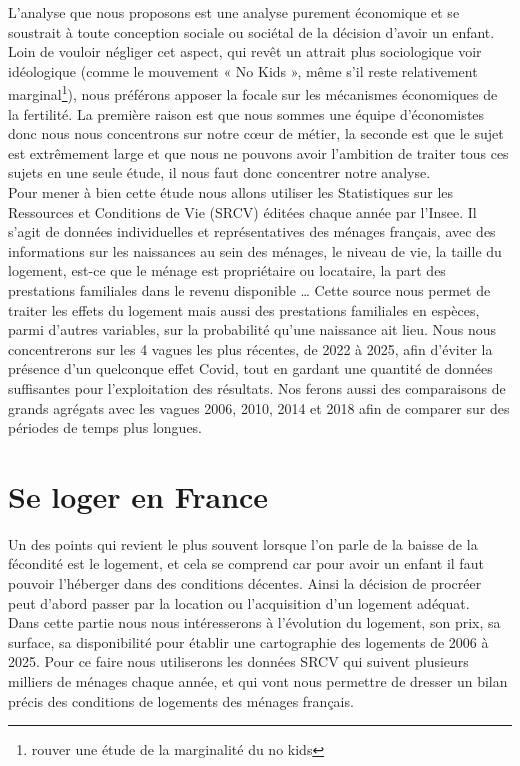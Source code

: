 \documentclass[12pt,a4paper]{article}
\begin{document}
\noindent L’analyse que nous proposons est une analyse purement économique et se soustrait à toute conception sociale ou sociétal de la décision d’avoir un enfant. Loin de vouloir négliger cet aspect, qui revêt un attrait plus sociologique voir idéologique (comme le mouvement « No Kids », même s’il reste relativement marginal\footnote{rouver une étude de la marginalité du no kids}), nous préférons apposer la focale sur les mécanismes économiques de la fertilité. La première raison est que nous sommes une équipe d’économistes donc nous nous concentrons sur notre cœur de métier, la seconde est que le sujet est extrêmement large et que nous ne pouvons avoir l’ambition de traiter tous ces sujets en une seule étude, il nous faut donc concentrer notre analyse. \\

\noindent Pour mener à bien cette étude nous allons utiliser les Statistiques sur les Ressources et Conditions de Vie (SRCV) éditées chaque année par l’Insee. Il s’agit de données individuelles et représentatives des ménages français, avec des informations sur les naissances au sein des ménages, le niveau de vie, la taille du logement, est-ce que le ménage est propriétaire ou locataire, la part des prestations familiales dans le revenu disponible … Cette source nous permet de traiter les effets du logement mais aussi des prestations familiales en espèces, parmi d’autres variables, sur la probabilité qu’une naissance ait lieu. Nous nous concentrerons sur les 4 vagues les plus récentes, de 2022 à 2025, afin d’éviter la présence d’un quelconque effet Covid, tout en gardant une quantité de données suffisantes pour l’exploitation des résultats. Nos ferons aussi des comparaisons de grands agrégats avec les vagues 2006, 2010, 2014 et 2018 afin de comparer sur des périodes de temps plus longues. 
	
	\section{Se loger en France}
	
Un des points qui revient le plus souvent lorsque l’on parle de la baisse de la fécondité est le logement, et cela se comprend car pour avoir un enfant il faut pouvoir l’héberger dans des conditions décentes. Ainsi la décision de procréer peut d’abord passer par la location ou l’acquisition d’un logement adéquat. \\

\noindent Dans cette partie nous nous intéresserons à l’évolution du logement, son prix, sa surface, sa disponibilité pour établir une cartographie des logements de 2006 à 2025. Pour ce faire nous utiliserons les données SRCV qui suivent plusieurs milliers de ménages chaque année, et qui vont nous permettre de dresser un bilan précis des conditions de logements des ménages français. 
\end{document}
